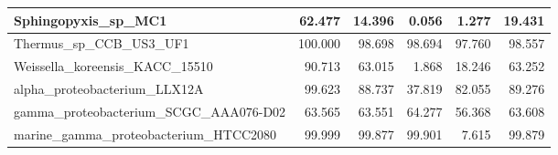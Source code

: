 \documentclass[12pt,a4paper]{article}
\begin{document}
\begin{table}[ht]
\begin{center}
\begin{tabular}{|l*{5}{|r}|}
Sphingopyxis\_sp\_MC1 & 62.477 & 14.396 & 0.056 & 1.277 & 19.431 \\ \hline
Thermus\_sp\_CCB\_US3\_UF1 & 100.000 & 98.698 & 98.694 & 97.760 & 98.557 \\ \hline
Weissella\_koreensis\_KACC\_15510 & 90.713 & 63.015 & 1.868 & 18.246 & 63.252 \\ \hline
alpha\_proteobacterium\_LLX12A & 99.623 & 88.737 & 37.819 & 82.055 & 89.276 \\ \hline
gamma\_proteobacterium\_SCGC\_AAA076-D02 & 63.565 & 63.551 & 64.277 & 56.368 & 63.608 \\ \hline
marine\_gamma\_proteobacterium\_HTCC2080 & 99.999 & 99.877 & 99.901 & 7.615 & 99.879 \\ \hline
\end{tabular}
\end{center}
\end{table}
\end{document}
